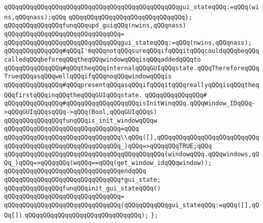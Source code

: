 \verb|qQQqqQQqqQQqqQQqqQQqqQQqqQQqqQQqqQQqqQQqqQQqqQQqgui_stateqQQq:=qQQq(wins,qQQqnass);qQQq|\newline
\verb|qQQqqQQqqQQqqQQqqQQqqQQqqQQqqQQq};|\newline
\newline
\newline
\verb|qQQqqQQqqQQqqQQqfunqQQqupd_guiqQQq(nwins,qQQqnass)|\newline
\verb|qQQqqQQqqQQqqQQqqQQqqQQqqQQqqQQq=|\newline
\verb|qQQqqQQqqQQqqQQqqQQqqQQqqQQqqQQqgui_stateqQQq:=qQQq(nwins,qQQqnass);|\newline
\newline
\verb|qQQqqQQqqQQqqQQq#qQQqI'mqQQqnotqQQqsureqQQqifqQQqitqQQqcouldqQQqbeqQQqcalledqQQqbeforeqQQqtheqQQqwindowqQQqisqQQqaddedqQQqto|\newline
\verb|qQQqqQQqqQQqqQQq#qQQqtheqQQqinternalqQQqGUIqQQqstate.qQQqThereforeqQQqTrueqQQqasqQQqwellqQQqifqQQqnoqQQqwindowqQQqis|\newline
\verb|qQQqqQQqqQQqqQQq#qQQqpresentqQQqasqQQqifqQQqitqQQqreallyqQQqisqQQqtheqQQqfirstqQQqinqQQqtheqQQqGUIqQQqstate.|\newline
\verb|qQQqqQQqqQQqqQQq#|\newline
\verb|qQQqqQQqqQQqqQQq#qQQqqQQqqQQqqQQqqQQqisInitWinqQQq.qQQqWindow_IDqQQq->qQQqGUIqQQqsqQQq->qQQq(Bool,qQQqGUIqQQqs)|\newline
\newline
\verb|qQQqqQQqqQQqqQQqfunqQQqis_init_windowqQQqw|\newline
\verb|qQQqqQQqqQQqqQQqqQQqqQQqqQQqqQQq=qQQq|\newline
\verb|qQQqqQQqqQQqqQQqqQQqqQQqqQQqqQQq\\qQQq([],qQQqqQQqqQQqqQQqqQQqqQQqqQQqqQQqqQQqqQQqqQQqqQQqqQQqqQQqqQQq_)qQQq=>qQQqqQQqTRUE;qQQq|\newline
\verb|qQQqqQQqqQQqqQQqqQQqqQQqqQQqqQQqqQQqqQQqqQQq(windowqQQq.qQQqwindows,qQQq_)qQQq=>qQQqqQQq(wqQQq==qQQq(get_window_idqQQqwindow));|\newline
\verb|qQQqqQQqqQQqqQQqqQQqqQQqqQQqqQQqendqQQq|\newline
\newline
\verb|qQQqqQQqqQQqqQQqqQQqqQQqqQQqqQQq*gui_state;|\newline
\newline
\verb|qQQqqQQqqQQqqQQqfunqQQqinit_gui_stateqQQq()|\newline
\verb|qQQqqQQqqQQqqQQqqQQqqQQqqQQqqQQq=|\newline
\verb|qQQqqQQqqQQqqQQqqQQqqQQqqQQqqQQq(qQQqqQQqqQQqgui_stateqQQq:=qQQq([],qQQq[])|\newline
\verb|qQQqqQQqqQQqqQQqqQQqqQQqqQQqqQQq);|\newline
\newline
\verb|};|\newline
\newline
\newline
\newline

